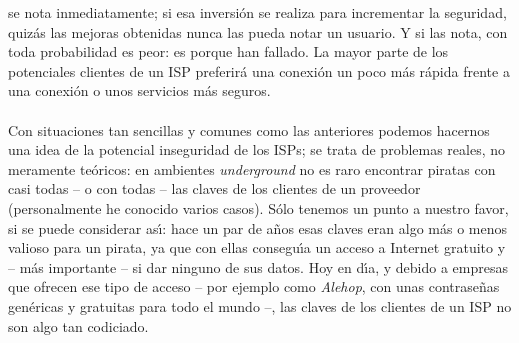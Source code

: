 se nota inmediatamente; si esa inversi\'on se realiza para incrementar la 
seguridad, quiz\'as las mejoras obtenidas nunca las pueda notar un usuario. Y 
si las nota, con toda probabilidad es peor: es porque han fallado. La 
mayor parte de los potenciales clientes de un ISP preferir\'a una conexi\'on
un poco m\'as r\'apida frente a una conexi\'on o unos servicios m\'as seguros.\\
\\Con situaciones tan sencillas y comunes como las anteriores podemos hacernos
una idea de la potencial inseguridad de los ISPs; se trata de problemas reales,
no meramente te\'oricos: en ambientes {\it underground} no es raro encontrar
piratas con casi todas -- o con todas -- las claves de los clientes de un
proveedor (personalmente he conocido varios casos). S\'olo tenemos un punto a
nuestro favor, si se puede considerar as\'{\i}: hace un par de a\~nos esas 
claves eran algo m\'as o menos valioso para un pirata, ya que con ellas 
consegu\'{\i}a un acceso a Internet gratuito y -- m\'as importante -- si dar 
ninguno de sus datos. Hoy en d\'{\i}a, y debido a empresas que ofrecen ese
tipo de acceso -- por ejemplo como {\it Alehop}, con unas contrase\~nas
gen\'ericas y gratuitas para todo el mundo --, las claves de los clientes de un
ISP no son algo tan codiciado.
